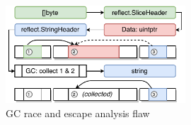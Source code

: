 \begin{figure}[!t]
    \centering
    \includegraphics[width=0.6\textwidth]{assets/figures/chapter3/gcrace-vuln.pdf}
    \caption{GC race and escape analysis flaw}
    \label{fig:gcrace-vuln}
\end{figure}
